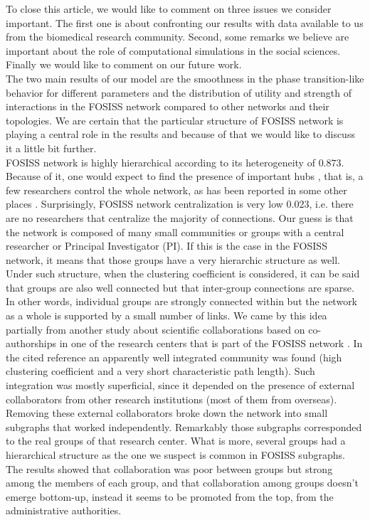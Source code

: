 \documentclass[11pt]{article}
\begin{document}
 To close this article, we would like to comment on three
  issues we consider important. The first one is about confronting our
  results with data available to us from the biomedical research
  community. Second, some remarks we believe are important about the
  role of computational simulations in the social sciences. Finally we
  would like to comment on our future work.\\


  The two main results of our model are the smoothness in
  the phase transition-like behavior for different parameters and the
  distribution of utility and strength of interactions in the FOSISS
  network compared to other networks and their topologies. We are
  certain that the particular structure of FOSISS network is playing a
  central role in the results and because of that we would like to
  discuss it a little bit further.\\

  FOSISS network is highly hierarchical according to its
  heterogeneity of $0.873$. Because of it, one would expect to find
  the presence of important hubs \cite{Wu-etal2008}, that is, a few
  researchers control the whole network, as has been reported in some
  other places \cite{yousefi-etal2008}. Surprisingly, FOSISS network
  centralization is very low $0.023$, i.e. there are no researchers
  that centralize the majority of connections. Our guess is that the
  network is composed of many small communities or groups with a
  central researcher or Principal Investigator (PI). If this is the
  case in the FOSISS network, it means that those groups have a very
  hierarchic structure as well.\\

  Under such structure, when the clustering coefficient is
  considered, it can be said that groups are also well connected but
  that inter-group connections are sparse. In other words, individual
  groups are strongly connected within but the network as a whole is
  supported by a small number of links. We came by this idea partially
  from another study about scientific collaborations based on
  co-authorships in one of the research centers that is part of the
  FOSISS network \cite{HernandezLemus2013}. In the cited reference an
  apparently well integrated community was found (high clustering
  coefficient and a very short characteristic path length). Such
  integration was mostly superficial, since it depended on the
  presence of external collaborators from other research institutions
  (most of them from overseas).  Removing these external collaborators
  broke down the network into small subgraphs that worked
  independently. Remarkably those subgraphs corresponded to the real
  groups of that research center.  What is more, several groups had a
  hierarchical structure as the one we suspect is common in FOSISS
  subgraphs. The results showed that collaboration was poor between
  groups but strong among the members of each group, and that
  collaboration among groups doesn't emerge bottom-up, instead it
  seems to be promoted from the top, from the administrative
  authorities.\\
\end{document}
